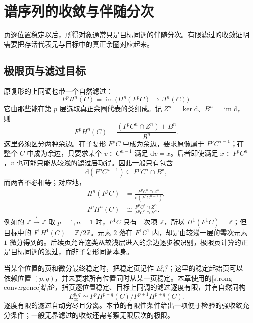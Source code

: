 
\section{谱序列的收敛与伴随分次}
\label{b4:sec:1403}

页逐位置稳定以后，所得对象通常只是目标同调的伴随分次。有限滤过的收敛证明需要把存活代表元与目标中的真正余圈对应起来。

%
%

\subsection{极限页与滤过目标}
\label{b4:subsec:1403:01}

原复形的上同调也带一个自然滤过：
\[
	F^pH^n(C)=\operatorname{im}\bigl(H^n(F^pC)\to H^n(C)\bigr).
\]
它由那些能在第 \(p\) 层选取真正余圈代表的类组成。记 \(Z^n=\ker \mathrm{d}\)、\(B^n=\operatorname{im}\mathrm{d}\)，则
\[
	F^pH^n(C)=\frac{(F^pC^n\cap Z^n)+B^n}{B^n}.
\]
这里必须区分两种余边。在子复形 \(F^pC\) 中成为余边，要求原像属于 \(F^pC^{n-1}\)；在整个 \(C\) 中成为余边，只要求某个 \(v\in C^{n-1}\) 满足 \(\mathrm{d}v=x\)。后者即使满足 \(x\in F^pC^n\)，\(v\) 也可能只能从较浅的滤过层取得。因此一般只有包含
\[
	\mathrm{d}(F^pC^{n-1})\subseteq F^pC^n\cap B^n,
\]
而两者不必相等；对应地，
\[
	\begin{aligned}
		H^n(F^pC)&=\frac{F^pC^n\cap Z^n}{\mathrm{d}(F^pC^{n-1})},\\
		F^pH^n(C)&\cong\frac{F^pC^n\cap Z^n}{F^pC^n\cap B^n}.
	\end{aligned}
\]
例如的 \(\mathbb Z\xrightarrow{2}\mathbb Z\) 取 \(p=1,n=1\) 时，\(F^1C\) 只有一次项 \(\mathbb Z\)，所以 \(H^1(F^1C)=\mathbb Z\)；但目标中的 \(F^1H^1(C)=\mathbb Z/2\mathbb Z\)。元素 \(2\) 落在 \(F^1C^1\) 内，却是由较浅一层的零次元素 \(1\) 微分得到的。后续页允许这类从较浅层进入的余边逐步被识别，极限页计算的正是目标同调的滤过，而非子复形同调本身。

\ProseParagraphBreak

当某个位置的页和微分最终稳定时，把稳定页记作 \(E_\infty^{p,q}\)；这里的稳定起始页可以依赖位置 \((p,q)\)，并未要求所有位置同时从某一页稳定。本章使用的[strong convergence]结论，指页逐位置稳定、目标上同调的滤过逐度有限，并有自然同构
\[
	E_\infty^{p,q}\simeq F^pH^{p+q}(C)/F^{p+1}H^{p+q}(C).
\]
逐度有限的滤过自动穷尽且分离。本节的有限性条件给出一项便于检验的强收敛充分条件；一般无界滤过的收敛还需考察无限层次的极限。

